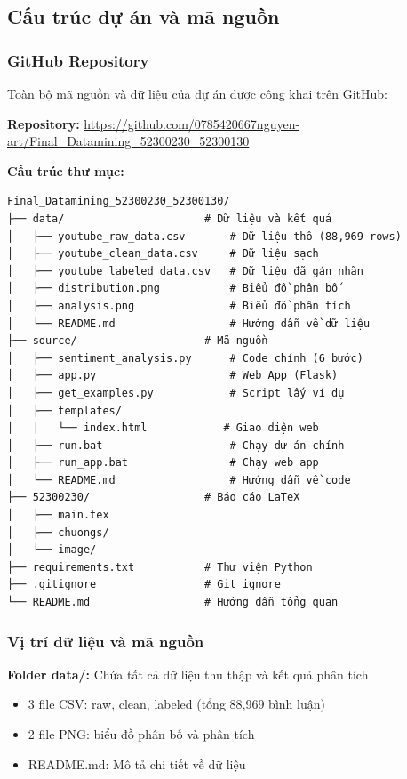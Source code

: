 \subsection{Cấu trúc dự án và mã nguồn}

\subsubsection{GitHub Repository}
Toàn bộ mã nguồn và dữ liệu của dự án được công khai trên GitHub:

\textbf{Repository:} \url{https://github.com/0785420667nguyen-art/Final_Datamining_52300230_52300130}

\textbf{Cấu trúc thư mục:}
\begin{verbatim}
Final_Datamining_52300230_52300130/
├── data/                      # Dữ liệu và kết quả
│   ├── youtube_raw_data.csv       # Dữ liệu thô (88,969 rows)
│   ├── youtube_clean_data.csv     # Dữ liệu sạch
│   ├── youtube_labeled_data.csv   # Dữ liệu đã gán nhãn
│   ├── distribution.png           # Biểu đồ phân bố
│   ├── analysis.png               # Biểu đồ phân tích
│   └── README.md                  # Hướng dẫn về dữ liệu
├── source/                    # Mã nguồn
│   ├── sentiment_analysis.py      # Code chính (6 bước)
│   ├── app.py                     # Web App (Flask)
│   ├── get_examples.py            # Script lấy ví dụ
│   ├── templates/
│   │   └── index.html            # Giao diện web
│   ├── run.bat                    # Chạy dự án chính
│   ├── run_app.bat                # Chạy web app
│   └── README.md                  # Hướng dẫn về code
├── 52300230/                  # Báo cáo LaTeX
│   ├── main.tex
│   ├── chuongs/
│   └── image/
├── requirements.txt           # Thư viện Python
├── .gitignore                 # Git ignore
└── README.md                  # Hướng dẫn tổng quan
\end{verbatim}

\subsubsection{Vị trí dữ liệu và mã nguồn}
\textbf{Folder data/:} Chứa tất cả dữ liệu thu thập và kết quả phân tích
\begin{itemize}
    \item 3 file CSV: raw, clean, labeled (tổng 88,969 bình luận)
    \item 2 file PNG: biểu đồ phân bố và phân tích
    \item README.md: Mô tả chi tiết về dữ liệu
\end{itemize}


